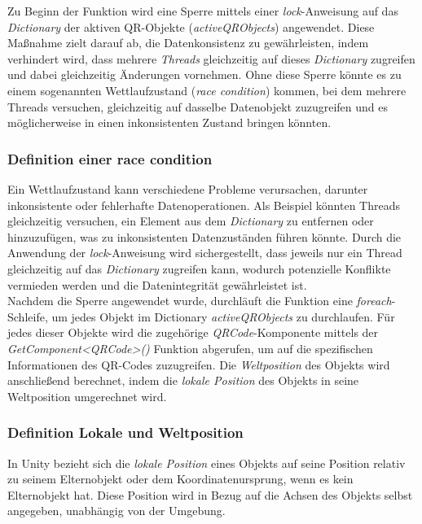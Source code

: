 Zu Beginn der Funktion wird eine Sperre mittels einer \textit{lock}-Anweisung auf das \textit{Dictionary} der aktiven
QR-Objekte (\textit{activeQRObjects}) angewendet. Diese Maßnahme zielt darauf ab, die Datenkonsistenz zu gewährleisten,
indem verhindert wird, dass mehrere \textit{Threads} gleichzeitig auf dieses \textit{Dictionary} zugreifen und dabei
gleichzeitig Änderungen vornehmen. Ohne diese Sperre könnte es zu einem sogenannten Wettlaufzustand (\textit{race condition})
kommen, bei dem mehrere Threads versuchen, gleichzeitig auf dasselbe Datenobjekt zuzugreifen und es möglicherweise in
einen inkonsistenten Zustand bringen könnten.

\subsubsection*{Definition einer race condition}
Ein Wettlaufzustand kann verschiedene Probleme verursachen, darunter inkonsistente oder fehlerhafte Datenoperationen.
Als Beispiel könnten Threads gleichzeitig versuchen, ein Element aus dem \textit{Dictionary} zu entfernen oder hinzuzufügen,
was zu inkonsistenten Datenzuständen führen könnte. Durch die Anwendung der \textit{lock}-Anweisung wird sichergestellt,
dass jeweils nur ein Thread gleichzeitig auf das \textit{Dictionary} zugreifen kann, wodurch potenzielle Konflikte
vermieden werden und die Datenintegrität gewährleistet ist.\\

Nachdem die Sperre angewendet wurde, durchläuft die Funktion eine \textit{foreach}-Schleife, um jedes Objekt im Dictionary
\textit{activeQRObjects} zu durchlaufen. Für jedes dieser Objekte wird die zugehörige \textit{QRCode}-Komponente mittels
der \textit{GetComponent<QRCode>()} Funktion abgerufen, um auf die spezifischen Informationen des QR-Codes zuzugreifen.
Die \textit{Weltposition} des Objekts wird anschließend berechnet, indem die \textit{lokale Position} des Objekts in
seine Weltposition umgerechnet wird.

\subsubsection*{Definition Lokale und Weltposition}
In Unity bezieht sich die \textit{lokale Position} eines Objekts auf seine Position relativ zu seinem Elternobjekt oder
dem Koordinatenursprung, wenn es kein Elternobjekt hat. Diese Position wird in Bezug auf die Achsen des Objekts selbst
angegeben, unabhängig von der Umgebung.

